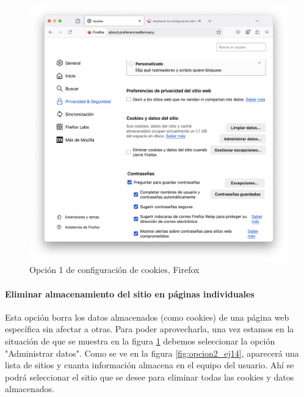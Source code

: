 \begin{figure}[H]   
    \centering
    \includegraphics[width=\textwidth]{opcion1_ej14.png}
    \caption{Opción 1 de configuración de cookies, Firefox}
    \label{fig:opcion1_ej14}
\end{figure}


\paragraph{Eliminar almacenamiento del sitio en páginas individuales }

Esta opción borra los datos almacenados (como cookies) de una página web específica sin afectar a otras. Para poder aprovecharla, una vez estamos en la situación de que se muestra en la figura \ref{fig:opcion1_ej14} debemos seleccionar la opción "Administrar datos". Como se ve en la figura \ref{fig:opcion2_ej14}, aparecerá una lista de sitios y cuanta información almacena en el equipo del usuario. Ahí se podrá seleccionar el sitio que se desee para eliminar todas las cookies y datos almacenados.

